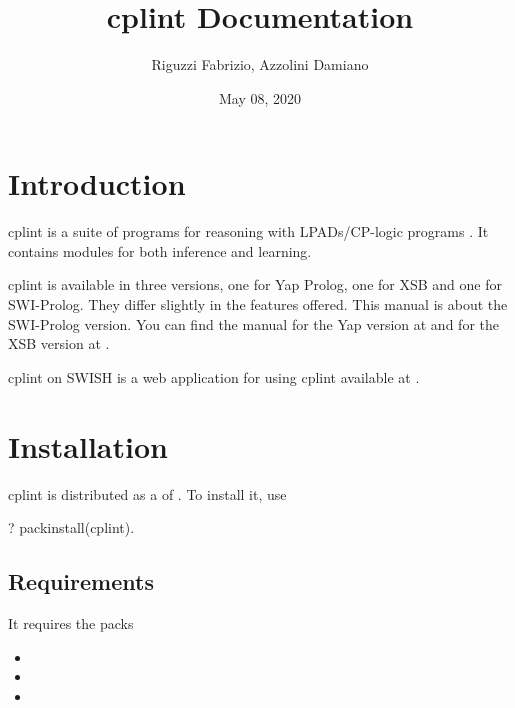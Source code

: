 \documentclass[letterpaper,10pt,english]{sphinxmanual}
\title{cplint Documentation}
\date{May 08, 2020}
\author{Riguzzi Fabrizio, Azzolini Damiano}
\begin{document}
\pagestyle{empty}
\sphinxmaketitle
\pagestyle{plain}
\sphinxtableofcontents
\pagestyle{normal}
\label{\detokenize{index::doc}}



\chapter{Introduction}
\label{\detokenize{index:introduction}}
cplint is a suite of programs for reasoning with LPADs/CP-logic programs .
It contains modules for both inference and learning.

cplint is available in three versions, one for Yap Prolog, one for XSB and one for SWI-Prolog.
They differ slightly in the features offered.
This manual is about the SWI-Prolog version.
You can find the manual for the Yap version at  and
for the XSB version at .

cplint on SWISH is a web application for using cplint available at .


\chapter{Installation}
\label{\detokenize{index:installation}}
cplint is distributed as a  of .
To install it, use

\begin{sphinxVerbatim}[commandchars=\\\{\}]
?\PYGZhy{} pack\PYGZus{}install(cplint).
\end{sphinxVerbatim}


\section{Requirements}
\label{\detokenize{index:requirements}}
It requires the packs
\begin{itemize}
\item {} 

\item {} 

\item {} 

\end{itemize}
\end{document}
